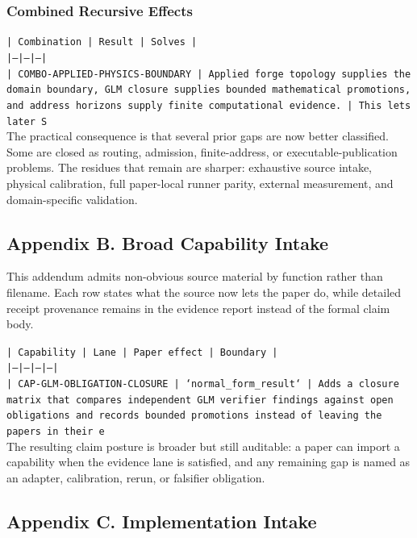 \documentclass[11pt]{article}
\begin{document}
\subsubsection*{Combined Recursive Effects}

\noindent\texttt{| Combination | Result | Solves |}\\
\noindent\texttt{|---|---|---|}\\
\noindent\texttt{| COMBO-APPLIED-PHYSICS-BOUNDARY | Applied forge topology supplies the domain boundary, GLM closure supplies bounded mathematical promotions, and address horizons supply finite computational evidence. | This lets later S}\\

The practical consequence is that several prior gaps are now better classified. Some are closed as routing, admission, finite-address, or executable-publication problems. The residues that remain are sharper: exhaustive source intake, physical calibration, full paper-local runner parity, external measurement, and domain-specific validation.

\subsection*{Appendix B. Broad Capability Intake}

This addendum admits non-obvious source material by function rather than filename. Each row states what the source now lets the paper do, while detailed receipt provenance remains in the evidence report instead of the formal claim body.

\noindent\texttt{| Capability | Lane | Paper effect | Boundary |}\\
\noindent\texttt{|---|---|---|---|}\\
\noindent\texttt{| CAP-GLM-OBLIGATION-CLOSURE | `normal\_form\_result` | Adds a closure matrix that compares independent GLM verifier findings against open obligations and records bounded promotions instead of leaving the papers in their e}\\

The resulting claim posture is broader but still auditable: a paper can import a capability when the evidence lane is satisfied, and any remaining gap is named as an adapter, calibration, rerun, or falsifier obligation.

\subsection*{Appendix C. Implementation Intake}
\end{document}
